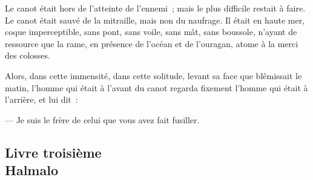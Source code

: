 \documentclass[french,twoside]{book} %
\begin{document}
Le canot était hors de l’atteinte de l’ennemi ; mais le plus difficile restait à faire. Le canot était sauvé de la mitraille, mais non du naufrage. Il était en haute mer, coque imperceptible, sans pont, sans voile, sans mât, sans boussole, n’ayant de ressource que la rame, en présence de l’océan et de l’ouragan, atome à la merci des colosses.\par
Alors, dans cette immensité, dans cette solitude, levant sa face que blêmissait le matin, l’homme qui était à l’avant du canot regarda fixement l’homme qui était à l’arrière, et lui dit :\par
— Je suis le frère de celui que vous avez fait fusiller.
 \subsection[{Livre troisième. Halmalo}]{Livre troisième \\
Halmalo}
\label{p1l3}
\end{document}
